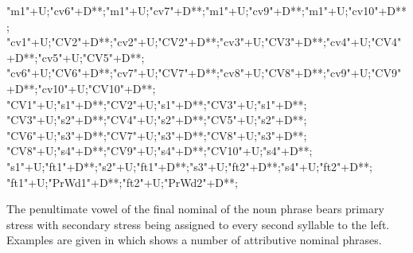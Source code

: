 \begin{multicols}{2}
\begin{exe}
{				"m1"+U;"cv6"+D**\dir{-};"m1"+U;"cv7"+D**\dir{-};"m1"+U;"cv9"+D**\dir{-};"m1"+U;"cv10"+D**\dir{-};
				"cv1"+U;"CV2"+D**\dir{-};"cv2"+U;"CV2"+D**\dir{-};"cv3"+U;"CV3"+D**\dir{-};"cv4"+U;"CV4"+D**\dir{-};"cv5"+U;"CV5"+D**\dir{};
				"cv6"+U;"CV6"+D**\dir{-};"cv7"+U;"CV7"+D**\dir{-};"cv8"+U;"CV8"+D**\dir{};"cv9"+U;"CV9"+D**\dir{-};"cv10"+U;"CV10"+D**\dir{-};
				"CV1"+U;"s1"+D**\dir{-};"CV2"+U;"s1"+D**\dir{-};"CV3"+U;"s1"+D**\dir{-};
				"CV3"+U;"s2"+D**\dir{-};"CV4"+U;"s2"+D**\dir{-};"CV5"+U;"s2"+D**\dir{-};
				"CV6"+U;"s3"+D**\dir{-};"CV7"+U;"s3"+D**\dir{-};"CV8"+U;"s3"+D**\dir{-};
				"CV8"+U;"s4"+D**\dir{-};"CV9"+U;"s4"+D**\dir{-};"CV10"+U;"s4"+D**\dir{-};
				"s1"+U;"ft1"+D**\dir{-};"s2"+U;"ft1"+D**\dir{-};"s3"+U;"ft2"+D**\dir{-};"s4"+U;"ft2"+D**\dir{-};
				"ft1"+U;"PrWd1"+D**\dir{-};"ft2"+U;"PrWd2"+D**\dir{-};
		\endxy}
	\end{exe}
\end{multicols}

The penultimate vowel of the final nominal of 
the noun phrase bears primary stress
with secondary stress being assigned
to every second syllable to the left.
Examples are given in  which shows a number
of attributive nominal phrases.

\begin{exe}
\end{exe}


